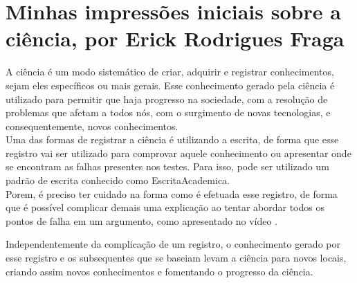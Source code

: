 \section{Minhas impressões iniciais sobre a ciência, por Erick Rodrigues Fraga}

A ciência é um modo sistemático de criar, adquirir e registrar conhecimentos, sejam eles específicos ou mais gerais. Esse conhecimento gerado pela ciência é utilizado para permitir que haja progresso na sociedade, com a resolução de problemas que afetam a todos nós, com o surgimento de novas tecnologias, e consequentemente, novos conhecimentos.\\

Uma das formas de registrar a ciência é utilizando a escrita, de forma que esse registro vai ser utilizado para comprovar aquele conhecimento ou apresentar onde se encontram as falhas presentes nos testes. Para isso, pode ser utilizado um padrão de escrita conhecido como \gls{EscritaAcademica}.\\

Porem, é preciso ter cuidado na forma como é efetuada esse registro, de forma que é possível complicar demais uma explicação ao tentar abordar todos os pontos de falha em um argumento, como apresentado no vídeo \citep{answer_in_progress_why_2022}.

Independentemente da complicação de um registro, o conhecimento gerado por esse registro e os subsequentes que se baseiam levam a ciência para novos locais, criando assim novos conhecimentos e fomentando o progresso da ciência.

